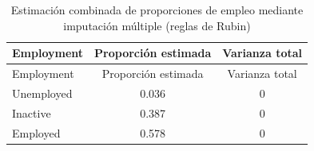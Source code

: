 \documentclass[
  spanish,
  12pt,
]{book}
\begin{document}
\begin{longtable}[]{@{}lcc@{}}
\caption{\label{tab:tab-im-resultado-proporciones}Estimación combinada de proporciones de empleo mediante imputación múltiple (reglas de Rubin)}\tabularnewline
\toprule\noalign{}
Employment & Proporción estimada & Varianza total \\
\midrule\noalign{}
\endfirsthead
\toprule\noalign{}
Employment & Proporción estimada & Varianza total \\
\midrule\noalign{}
\endhead
\bottomrule\noalign{}
\endlastfoot
Unemployed & 0.036 & 0 \\
Inactive & 0.387 & 0 \\
Employed & 0.578 & 0 \\
\end{longtable}


\end{document}
